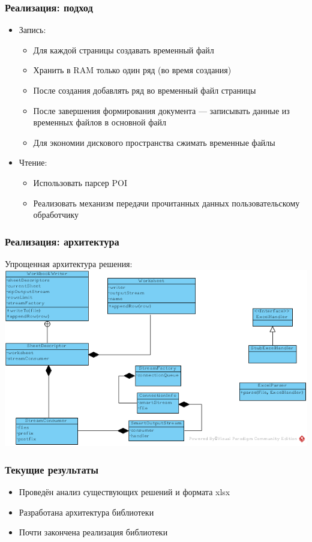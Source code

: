 \documentclass{beamer}
\begin{document}
\begin{frame}\frametitle{Реализация: подход}
\begin{itemize}
    \item Запись:
    \begin{itemize}
        \item Для каждой страницы создавать временный файл
        \item Хранить в RAM только один ряд (во время создания)
        \item После создания добавлять ряд во временный файл страницы
        \item После завершения формирования документа --- записывать данные из временных файлов в основной файл
        \item Для экономии дискового пространства сжимать временные файлы
    \end{itemize}
    \item Чтение:
    \begin{itemize}
        \item Использовать парсер POI
        \item Реализовать механизм передачи прочитанных данных пользовательскому обработчику
    \end{itemize}
\end{itemize}
\end{frame}

\begin{frame}
  \transwipe[direction=90]
  \frametitle{Реализация: архитектура}
  Упрощенная архитектура решения:
  \includegraphics[width=\textwidth,height=\textheight,keepaspectratio]{arc.png}
\end{frame}

\begin{frame}\frametitle{Текущие результаты}
\begin{itemize}
    \item Проведён анализ существующих решений и формата xlsx
    \item Разработана архитектура библиотеки
    \item Почти закончена реализация библиотеки
\end{itemize}
\end{frame}
\end{document}
